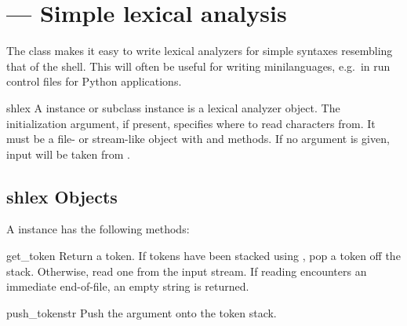 
\section{ ---
         Simple lexical analysis}



The  class makes it easy to write lexical analyzers for
simple syntaxes resembling that of the \UNIX{} shell.  This will often
be useful for writing minilanguages, e.g.\ in run control files for
Python applications.

\begin{classdesc}{shlex}{}
A  instance or subclass instance is a lexical analyzer
object.  The initialization argument, if present, specifies where to
read characters from. It must be a file- or stream-like object with
 and  methods.  If no argument is given,
input will be taken from .
\end{classdesc}


\begin{seealso}
\end{seealso}


\subsection{shlex Objects \label{shlex-objects}}

A  instance has the following methods:

\begin{methoddesc}{get_token}{}
Return a token.  If tokens have been stacked using
, pop a token off the stack.  Otherwise, read one
from the input stream.  If reading encounters an immediate
end-of-file, an empty string is returned. 
\end{methoddesc}

\begin{methoddesc}{push_token}{str}
Push the argument onto the token stack.
\end{methoddesc}

